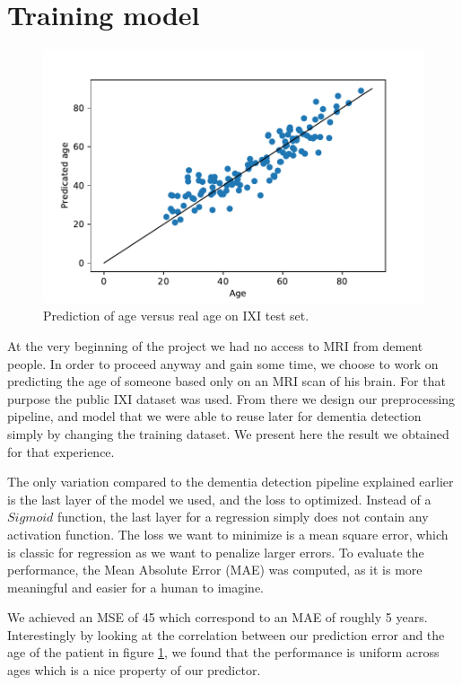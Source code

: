 \section{Training model}

\begin{figure}
 \centering
 \includegraphics[width=.9\linewidth]{figures/Age_pred_vs_age_IXI.pdf}
 \captionsetup{width=.9\linewidth}
 \caption{Prediction of age versus real age on IXI test set.}
 \label{fig:IXI_pred_vs_age}
\end{figure}

At the very beginning of the project we had no access to MRI from dement people. In order to proceed anyway and gain some time, we choose to work on predicting the age of someone based only on an MRI scan of his brain. For that purpose the public IXI dataset was used. From there we design our preprocessing pipeline, and model that we were able to reuse later for dementia detection simply by changing the training dataset. We present here the result we obtained for that experience.

The only variation compared to the dementia detection pipeline explained earlier is the last layer of the model we used, and the loss to optimized. Instead of a $Sigmoid$ function, the last layer for a regression simply does not contain any activation function. The loss we want to minimize is a mean square error, which is classic for regression as we want to penalize larger errors. To evaluate the performance, the Mean Absolute Error (MAE) was computed, as it is more meaningful and easier for a human to imagine.


We achieved an MSE of 45 which correspond to an MAE of roughly 5 years. Interestingly by looking at the correlation between our prediction error and the age of the patient in figure \ref{fig:IXI_pred_vs_age}, we found that the performance is uniform across ages which is a nice property of our predictor.

